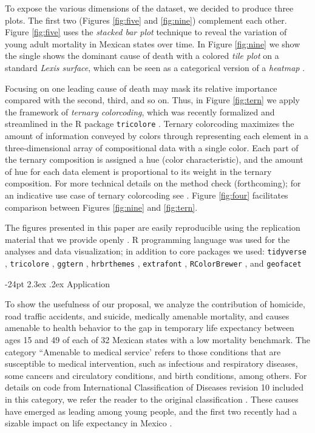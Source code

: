 \documentclass[10pt, twoside, parskip=half]{article}
\makeatletter
\renewcommand\section{\@startsection {section}{1}{\z@}%
                                   {-24pt}%
                                   {2.3ex \@plus.2ex}%
                                   {\normalfont\large\bfseries}}
\makeatother
\begin{document}
To expose the various dimensions of the dataset, we decided to produce three plots. The first two (Figures \ref{fig:five} and \ref{fig:nine}) complement each other. Figure \ref{fig:five} uses the \emph{stacked bar plot} technique to reveal the variation of young adult mortality in Mexican states over time. In Figure \ref{fig:nine} we show the single shows the dominant cause of death with a colored \emph{tile plot} on a standard \emph{Lexis surface}, which can be seen as a categorical version of a \emph{heatmap} \citep{scholey2017dr, rau2018}.

Focusing on one leading cause of death may mask its relative importance compared with the second, third, and so on. Thus, in Figure \ref{fig:tern} we apply the framework of \emph{ternary colorcoding}, which was recently formalized and streamlined in the R package \texttt{tricolore} \citep{scholey2018}. Ternary colorcoding maximizes the amount of information conveyed by colors through representing each element in a three-dimensional array of compositional data with a single color. Each part of the ternary composition is assigned a hue (color characteristic), and the amount of hue for each data element is proportional to its weight in the ternary composition. For more technical details on the method check \citet{scholeyforthcomingdr} (forthcoming); for an indicative use case of ternary colorcoding see \citet{kashnitsky2018tl}. Figure \ref{fig:four} facilitates comparison between Figures \ref{fig:nine} and \ref{fig:tern}.

The figures presented in this paper are easily reproducible using the replication material that we provide openly \citep{kashnitsky2019}. R programming language \citep{rcoreteam2018} was used for the analyses and data visualization; in addition to core packages we used: \texttt{tidyverse} \citep{wickham2017b}, \texttt{tricolore} \citep{scholey2018}, \texttt{ggtern} \citep{hamilton2018jssa}, \texttt{hrbrthemes} \citep{rudis2018}, \texttt{extrafont} \citep{chang2014}, \texttt{RColorBrewer} \citep{neuwirth2014}, and \texttt{geofacet} \citep{hafen2019}

\hypertarget{application}{%
\section{Application}\label{application}}

To show the usefulness of our proposal, we analyze the contribution of homicide, road traffic accidents, and suicide, medically amenable mortality, and causes amenable to health behavior to the gap in temporary life expectancy between ages 15 and 49 of each of 32 Mexican states with a low mortality benchmark. The category ``Amenable to medical service' refers to those conditions that are susceptible to medical intervention, such as infectious and respiratory diseases, some cancers and circulatory conditions, and birth conditions, among others. For details on code from International Classification of Diseases revision 10 included in this category, we refer the reader to the original classification \citep{aburto2018bo}. These causes have emerged as leading among young people, and the first two recently had a sizable impact on life expectancy in Mexico \citep{aburto2016ha, aburto2019ajph}.
\end{document}
